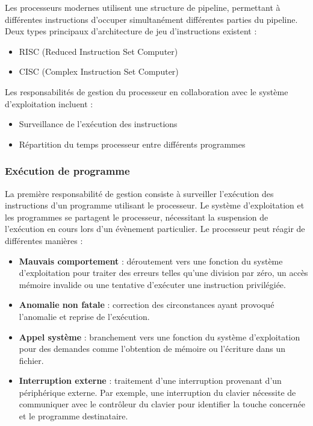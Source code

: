 Les processeurs modernes utilisent une structure de pipeline, permettant à différentes instructions d'occuper simultanément différentes parties du pipeline. 
Deux types principaux d'architecture de jeu d'instructions existent :
\begin{itemize}
    \item RISC (Reduced Instruction Set Computer)
    \item CISC (Complex Instruction Set Computer)
\end{itemize}

Les responsabilités de gestion du processeur en collaboration avec le système d'exploitation incluent :
\begin{itemize}
    \item Surveillance de l'exécution des instructions
    \item Répartition du temps processeur entre différents programmes
\end{itemize}


\subsubsection{Exécution de programme}

La première responsabilité de gestion consiste à surveiller l'exécution des instructions d'un programme utilisant le processeur. 
Le système d'exploitation et les programmes se partagent le processeur, nécessitant la suspension de l'exécution en cours lors d'un évènement particulier. 
Le processeur peut réagir de différentes manières :

\begin{itemize}
    \item \textbf{Mauvais comportement} : déroutement vers une fonction du système d'exploitation pour traiter des erreurs telles qu'une division par zéro, un accès mémoire invalide ou une tentative d'exécuter une instruction privilégiée.
    \item \textbf{Anomalie non fatale} : correction des circonstances ayant provoqué l'anomalie et reprise de l'exécution.
    \item \textbf{Appel système} : branchement vers une fonction du système d'exploitation pour des demandes comme l'obtention de mémoire ou l'écriture dans un fichier.
    \item \textbf{Interruption externe} : traitement d'une interruption provenant d'un périphérique externe. 
    Par exemple, une interruption du clavier nécessite de communiquer avec le contrôleur du clavier pour identifier la touche concernée et le programme destinataire.
\end{itemize}


